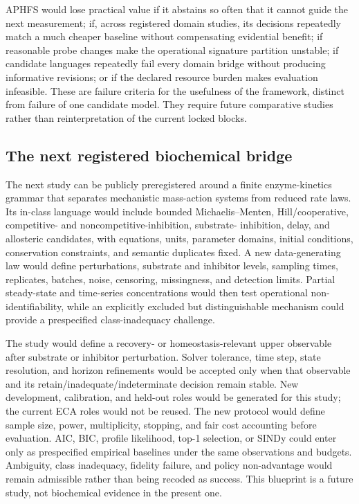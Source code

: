 \documentclass[10pt]{article}
\theoremstyle{definition}
\begin{document}
APHFS would lose practical value if it abstains so often that it cannot guide the next
measurement; if, across registered domain studies, its decisions repeatedly match a much cheaper
baseline without compensating evidential benefit; if reasonable probe changes make the operational
signature partition unstable; if candidate languages repeatedly fail every domain bridge without
producing informative revisions; or if the declared resource burden makes evaluation infeasible.
These are failure criteria for the usefulness of the framework, distinct from failure of one
candidate model. They require future comparative studies rather than reinterpretation of the
current locked blocks.

\subsection{The next registered biochemical bridge}

The next study can be publicly preregistered around a finite enzyme-kinetics grammar that separates
mechanistic mass-action systems from reduced rate laws. Its in-class language would include bounded
Michaelis--Menten, Hill/cooperative, competitive- and noncompetitive-inhibition, substrate-
inhibition, delay, and allosteric candidates, with equations, units, parameter domains, initial
conditions, conservation constraints, and semantic duplicates fixed. A new data-generating law
would define perturbations, substrate and inhibitor levels, sampling times, replicates, batches,
noise, censoring, missingness, and detection limits. Partial steady-state and time-series
concentrations would then test operational non-identifiability, while an explicitly excluded but
distinguishable mechanism could provide a prespecified class-inadequacy challenge.

The study would define a recovery- or homeostasis-relevant upper observable after substrate or
inhibitor perturbation. Solver tolerance, time step, state resolution, and horizon refinements
would be accepted only when that observable and its retain/inadequate/indeterminate decision remain
stable. New development, calibration, and held-out roles would be generated for this study; the
current ECA roles would not be reused. The new protocol would define sample size, power,
multiplicity, stopping, and fair cost accounting before evaluation. AIC, BIC, profile likelihood,
top-1 selection, or SINDy could enter only as prespecified empirical baselines under the same
observations and budgets. Ambiguity, class
inadequacy, fidelity failure, and policy non-advantage would remain admissible rather than being
recoded as success. This blueprint is a future study, not biochemical evidence in the present one.
\end{document}
